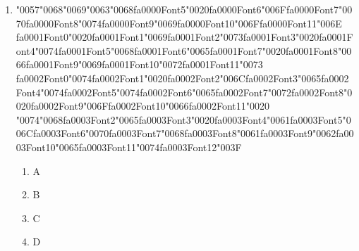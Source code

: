 \documentclass[12pt]{article}
\begin{document}
 \begin{enumerate}[label=Q\arabic*.]
 
 \item {\char"0057}{\char"0068}{\char"0069}{\char"0063}{\char"0068}{\csname fa0000Font5\endcsname\char"0020}{\csname fa0000Font6\endcsname\char"006F}{\csname fa0000Font7\endcsname\char"0070}{\csname fa0000Font8\endcsname\char"0074}{\csname fa0000Font9\endcsname\char"0069}{\csname fa0000Font10\endcsname\char"006F}{\csname fa0000Font11\endcsname\char"006E} {\csname fa0001Font0\endcsname\char"0020}{\csname fa0001Font1\endcsname\char"0069}{\csname fa0001Font2\endcsname\char"0073}{\csname fa0001Font3\endcsname\char"0020}{\csname fa0001Font4\endcsname\char"0074}{\csname fa0001Font5\endcsname\char"0068}{\csname fa0001Font6\endcsname\char"0065}{\csname fa0001Font7\endcsname\char"0020}{\csname fa0001Font8\endcsname\char"0066}{\csname fa0001Font9\endcsname\char"0069}{\csname fa0001Font10\endcsname\char"0072}{\csname fa0001Font11\endcsname\char"0073} {\csname fa0002Font0\endcsname\char"0074}{\csname fa0002Font1\endcsname\char"0020}{\csname fa0002Font2\endcsname\char"006C}{\csname fa0002Font3\endcsname\char"0065}{\csname fa0002Font4\endcsname\char"0074}{\csname fa0002Font5\endcsname\char"0074}{\csname fa0002Font6\endcsname\char"0065}{\csname fa0002Font7\endcsname\char"0072}{\csname fa0002Font8\endcsname\char"0020}{\csname fa0002Font9\endcsname\char"006F}{\csname fa0002Font10\endcsname\char"0066}{\csname fa0002Font11\endcsname\char"0020} {\char"0074}{\char"0068}{\csname fa0003Font2\endcsname\char"0065}{\csname fa0003Font3\endcsname\char"0020}{\csname fa0003Font4\endcsname\char"0061}{\csname fa0003Font5\endcsname\char"006C}{\csname fa0003Font6\endcsname\char"0070}{\csname fa0003Font7\endcsname\char"0068}{\csname fa0003Font8\endcsname\char"0061}{\csname fa0003Font9\endcsname\char"0062}{\csname fa0003Font10\endcsname\char"0065}{\csname fa0003Font11\endcsname\char"0074}{\csname fa0003Font12\endcsname\char"003F}
 \begin{enumerate}[label=(\Alph*)]
     \item A
     \item B
     \item C
     \item D
 \end{enumerate}
 

\end{enumerate}
\end{document}
